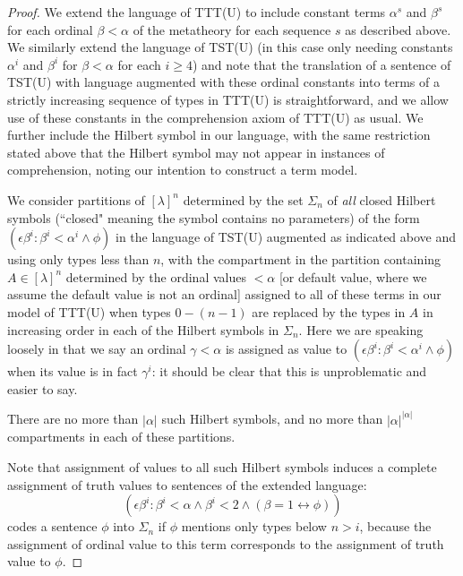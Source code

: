 \documentclass{article}
\theoremstyle{definition}
\theoremstyle{remark}
\begin{document}
{\begin{proof}
We extend the language of TTT(U) to include constant terms $\alpha^s$ and $\beta^s$ for each ordinal $\beta < \alpha$ of the metatheory for each sequence $s$ as described above.  We similarly extend the language of TST(U) (in this case only needing constants $\alpha^i$ and $\beta^i$ for $\beta<\alpha$ for each $i\geq4$)   and note that the translation of a sentence of TST(U) with language augmented with these ordinal constants into terms of a strictly increasing sequence of types in TTT(U) is straightforward, and we allow use of these constants in the comprehension axiom of TTT(U) as usual.  We further include the Hilbert symbol in our language, with the same restriction stated above that the Hilbert symbol may not appear in instances of comprehension, noting our intention to construct a term model.

We consider partitions of $[\lambda]^n$  determined by  the set $\Sigma_n$ of {\em all\/} closed Hilbert symbols (``closed" meaning the symbol contains no parameters) of the form $(\epsilon \beta^i:\beta^i < \alpha^i \wedge \phi)$
in the language of TST(U) augmented  as indicated above and using only types less than $n$, with the compartment in the partition containing $A \in [\lambda]^n$ determined by the ordinal values $<\alpha$ [or default value, where we assume the default value is not an ordinal] assigned to all of these terms in our model of TTT(U) when types $0-(n-1)$ are replaced by the types in $A$ in increasing order in each of the Hilbert symbols in $\Sigma_n$.  Here we are speaking loosely in that we say an ordinal $\gamma<\alpha$ is assigned as value to $(\epsilon \beta^i:\beta^i < \alpha^i \wedge \phi)$ when its value is in fact $\gamma^i$:  it should be clear that this is unproblematic and easier to say.

There are no more than $|\alpha|$ such Hilbert symbols, and no more than $|\alpha|^{|\alpha|}$ compartments in each of these partitions.

Note that assignment of values to all such Hilbert symbols induces a complete assignment of truth values to sentences of the extended language:  $$(\epsilon \beta^i:\beta^i<\alpha \wedge \beta^i<2 \wedge (\beta=1 \leftrightarrow \phi))$$ codes a sentence $\phi$ into $\Sigma_n$ if $\phi$ mentions only types below $n > i$, because the assignment of ordinal value to this term corresponds to the assignment of truth value to $\phi$.


\end{proof}}
\end{document}
